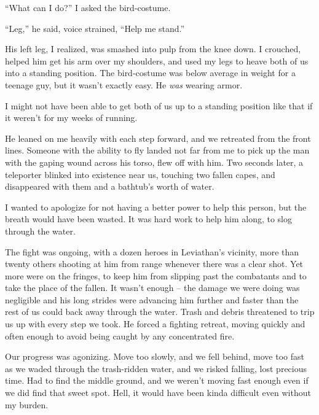 ``What can I do?'' I asked the bird-costume.



``Leg,'' he said, voice strained, ``Help me stand.''



His left leg, I realized, was smashed into pulp from the knee down.  I crouched, helped him get his arm over my shoulders, and used my legs to heave both of us into a standing position.  The bird-costume was below average in weight for a teenage guy, but it wasn't exactly easy.  He \emph{was} wearing armor.



I might not have been able to get both of us up to a standing position like that if it weren't for my weeks of running.



He leaned on me heavily with each step forward, and we retreated from the front lines.  Someone with the ability to fly landed not far from me to pick up the man with the gaping wound across his torso, flew off with him.  Two seconds later, a teleporter blinked into existence near us, touching two fallen capes, and disappeared with them and a bathtub's worth of water.



I wanted to apologize for not having a better power to help this person, but the breath would have been wasted.  It was hard work to help him along, to slog through the water.



The fight was ongoing, with a dozen heroes in Leviathan's vicinity, more than twenty others shooting at him from range whenever there was a clear shot.  Yet more were on the fringes, to keep him from slipping past the combatants and to take the place of the fallen.  It wasn't enough – the damage we were doing was negligible and his long strides were advancing him further and faster than the rest of us could back away through the water.  Trash and debris threatened to trip us up with every step we took.  He forced a fighting retreat, moving quickly and often enough to avoid being caught by any concentrated fire.



Our progress was agonizing.  Move too slowly, and we fell behind, move too fast as we waded through the trash-ridden water, and we risked falling, lost precious time.  Had to find the middle ground, and we weren't moving fast enough even if we did find that sweet spot.  Hell, it would have been kinda difficult even without my burden.



